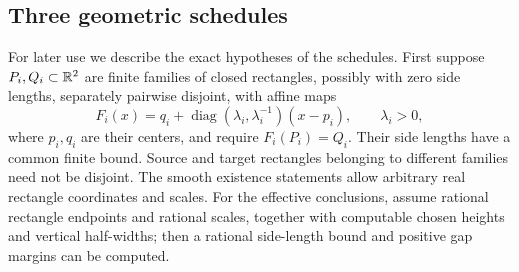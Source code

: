 \subsection{Three geometric schedules}

For later use we describe the exact hypotheses of the schedules.
First suppose $P_i,Q_i\subset\mathbb R^2$ are finite families of closed
rectangles, possibly with zero side lengths, separately
pairwise disjoint, with affine maps
\[
 F_i(x)=q_i+\operatorname{diag}(\lambda_i,\lambda_i^{-1})(x-p_i),
 \qquad \lambda_i>0,
\]
where $p_i,q_i$ are their centers, and require $F_i(P_i)=Q_i$.
Their side lengths have a common finite bound. Source and target rectangles
belonging to different families need not be disjoint. The smooth existence
statements allow arbitrary real rectangle coordinates and scales. For the
effective conclusions, assume rational rectangle endpoints and rational
scales, together with computable chosen heights and vertical half-widths;
then a rational side-length bound and positive gap margins can be computed.


